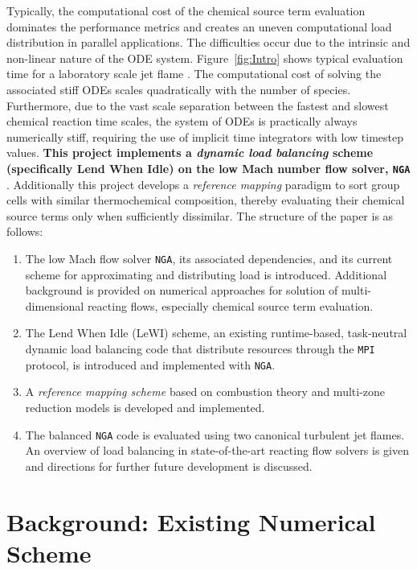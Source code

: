 \documentclass[letterpaper,twocolumn,10pt]{article}
\begin{document}
Typically, the computational cost of the chemical source term evaluation dominates the performance metrics and creates an uneven computational load distribution in parallel applications. The difficulties occur due to the intrinsic and non-linear nature of the ODE system. Figure~\ref{fig:Intro} shows typical evaluation time for a laboratory scale jet flame \cite{Lacey_thesis}. The computational cost of solving the associated stiff ODEs scales quadratically with the number of species. Furthermore, due to the vast scale separation between the fastest and slowest chemical reaction time scales, the system of ODEs is practically always numerically stiff, requiring the use of implicit time integrators with low timestep values. \textbf{This project implements a \emph{dynamic load balancing} scheme (specifically Lend When Idle) on the low Mach number flow solver, \texttt{NGA} \cite{DESJARDINS2008,MACART2016}}. Additionally this project develops a \emph{reference mapping} paradigm to sort group cells with similar thermochemical composition, thereby evaluating their chemical source terms only when sufficiently dissimilar. The structure of the paper is as follows:
\begin{enumerate}
\item The low Mach flow solver \texttt{NGA}, its associated dependencies, and its current scheme for approximating and distributing load is introduced. Additional background is provided on numerical approaches for solution of multi-dimensional reacting flows, especially chemical source term evaluation.
\item The Lend When Idle (LeWI) scheme, an existing runtime-based, task-neutral dynamic load balancing code that distribute resources through the \texttt{MPI} protocol, is introduced and implemented with \texttt{NGA}.
\item A \emph{reference mapping scheme} based on combustion theory and multi-zone reduction models is developed and implemented.
\item The balanced \texttt{NGA} code is evaluated using two canonical turbulent jet flames. An overview of load balancing in state-of-the-art reacting flow solvers is given and directions for further future development is discussed.
\end{enumerate}

\section{Background: Existing Numerical Scheme}
\end{document}
